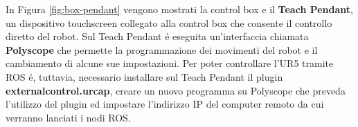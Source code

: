In Figura \ref{fig:box-pendant} vengono mostrati la control box e il \textbf{Teach Pendant}, un dispositivo touchscreen collegato 
alla control box che consente il controllo diretto del robot. Sul Teach Pendant \'{e} eseguita un'interfaccia chiamata \textbf{Polyscope} 
che permette la programmazione dei movimenti del robot e il cambiamento di alcune sue impostazioni. 
Per poter controllare l'UR5 tramite ROS \'{e}, tuttavia, necessario installare sul Teach Pendant il plugin \textbf{externalcontrol.urcap}, 
creare un nuovo programma su Polyscope che preveda l'utilizzo del plugin ed impostare l'indirizzo IP del computer remoto da cui 
verranno lanciati i nodi ROS.
